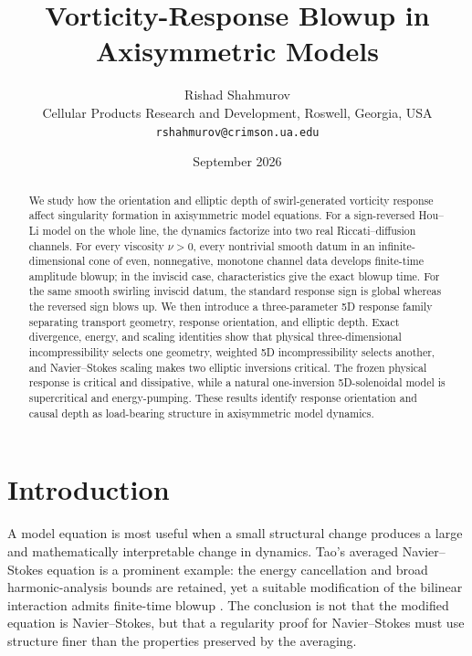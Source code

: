\documentclass[11pt]{article}
\title{\textbf{Vorticity-Response Blowup in Axisymmetric Models}}
\author{Rishad Shahmurov\\
Cellular Products Research and Development, Roswell, Georgia, USA\\
\texttt{rshahmurov@crimson.ua.edu}}
\date{September 2026}
\theoremstyle{definition}
\begin{document}
\maketitle

\begin{abstract}
We study how the orientation and elliptic depth of swirl-generated vorticity response affect singularity formation in axisymmetric model equations.  For a sign-reversed Hou--Li model on the whole line, the dynamics factorize into two real Riccati--diffusion channels.  For every viscosity $\nu>0$, every nontrivial smooth datum in an infinite-dimensional cone of even, nonnegative, monotone channel data develops finite-time amplitude blowup; in the inviscid case, characteristics give the exact blowup time.  For the same smooth swirling inviscid datum, the standard response sign is global whereas the reversed sign blows up.  We then introduce a three-parameter 5D response family separating transport geometry, response orientation, and elliptic depth.  Exact divergence, energy, and scaling identities show that physical three-dimensional incompressibility selects one geometry, weighted 5D incompressibility selects another, and Navier--Stokes scaling makes two elliptic inversions critical.  The frozen physical response is critical and dissipative, while a natural one-inversion 5D-solenoidal model is supercritical and energy-pumping.  These results identify response orientation and causal depth as load-bearing structure in axisymmetric model dynamics.
\end{abstract}

\section{Introduction}

A model equation is most useful when a small structural change produces a large and mathematically interpretable change in dynamics.  Tao's averaged Navier--Stokes equation is a prominent example: the energy cancellation and broad harmonic-analysis bounds are retained, yet a suitable modification of the bilinear interaction admits finite-time blowup \cite{Tao2016}.  The conclusion is not that the modified equation is Navier--Stokes, but that a regularity proof for Navier--Stokes must use structure finer than the properties preserved by the averaging.
\end{document}
